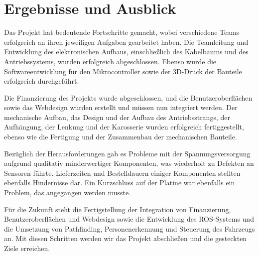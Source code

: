\chapter{Ergebnisse und Ausblick}

Das Projekt hat bedeutende Fortschritte gemacht, wobei verschiedene Teams erfolgreich an ihren jeweiligen Aufgaben gearbeitet haben. Die Teamleitung und Entwicklung des elektronischen Aufbaus, einschließlich des Kabelbaums und des Antriebssystems, wurden erfolgreich abgeschlossen. Ebenso wurde die Softwareentwicklung für den Mikrocontroller sowie der 3D-Druck der Bauteile erfolgreich durchgeführt.

Die Finanzierung des Projekts wurde abgeschlossen, und die Benutzeroberflächen sowie das Webdesign wurden erstellt und müssen nun integriert werden. Der mechanische Aufbau, das Design und der Aufbau des Antriebsstrangs, der Aufhängung, der Lenkung und der Karosserie wurden erfolgreich fertiggestellt, ebenso wie die Fertigung und der Zusammenbau der mechanischen Bauteile.

Bezüglich der Herausforderungen gab es Probleme mit der Spannungsversorgung aufgrund qualitativ minderwertiger Komponenten, was wiederholt zu Defekten an Sensoren führte. Lieferzeiten und Bestelldauern einiger Komponenten stellten ebenfalls Hindernisse dar. Ein Kurzschluss auf der Platine war ebenfalls ein Problem, das angegangen werden musste.

Für die Zukunft steht die Fertigstellung der Integration von Finanzierung, Benutzeroberflächen und Webdesign sowie die Entwicklung des ROS-Systems und die Umsetzung von Pathfinding, Personenerkennung und Steuerung des Fahrzeugs an. Mit diesen Schritten werden wir das Projekt abschließen und die gesteckten Ziele erreichen.
